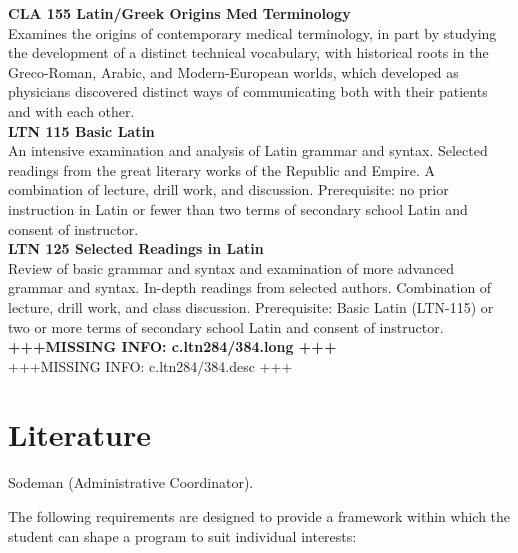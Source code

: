 \documentclass[
  letterpaper,
]{scrbook}
\begin{document}
\textbf{CLA 155 Latin/Greek Origins Med Terminology}\\
Examines the origins of contemporary medical terminology, in part by
studying the development of a distinct technical vocabulary, with
historical roots in the Greco-Roman, Arabic, and Modern-European worlds,
which developed as physicians discovered distinct ways of communicating
both with their patients and with each other.\\
\textbf{LTN 115 Basic Latin}\\
An intensive examination and analysis of Latin grammar and syntax.
Selected readings from the great literary works of the Republic and
Empire. A combination of lecture, drill work, and discussion.
Prerequisite: no prior instruction in Latin or fewer than two terms of
secondary school Latin and consent of instructor.\\
\textbf{LTN 125 Selected Readings in Latin}\\
Review of basic grammar and syntax and examination of more advanced
grammar and syntax. In-depth readings from selected authors. Combination
of lecture, drill work, and class discussion. Prerequisite: Basic Latin
(LTN-115) or two or more terms of secondary school Latin and consent of
instructor.\\
\textbf{+++MISSING INFO: c.ltn284/384.long +++}\\
+++MISSING INFO: c.ltn284/384.desc +++

\section{Literature}\label{sec-literature}

Sodeman (Administrative Coordinator).

The following requirements are designed to provide a framework within
which the student can shape a program to suit individual interests:
\end{document}
